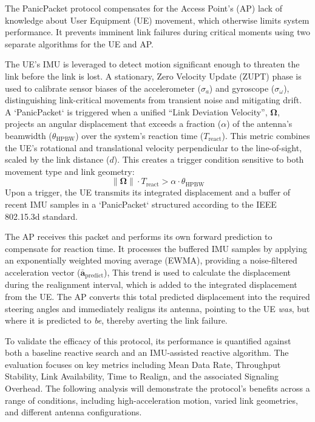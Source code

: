 \documentclass[fleqn,10pt]{wlscirep}
\begin{document}
The PanicPacket protocol compensates for the Access Point's (AP) lack of knowledge about User Equipment (UE) movement, which otherwise limits system performance. It prevents imminent link failures during critical moments using two separate algorithms for the UE and AP.

The UE's IMU is leveraged to detect motion significant enough to threaten the link before the link is lost. A stationary, Zero Velocity Update (ZUPT) phase is used to calibrate sensor biases of the accelerometer ($\sigma_a$) and gyroscope ($\sigma_{\omega}$), distinguishing link-critical movements from transient noise and mitigating drift. A `PanicPacket` is triggered when a unified ``Link Deviation Velocity'', $\boldsymbol{\Omega}$, projects an angular displacement that exceeds a fraction ($\alpha$) of the antenna's beamwidth ($\theta_{\text{HPBW}}$) over the system's reaction time ($T_{\text{react}}$). This metric combines the UE's rotational and translational velocity perpendicular to the line-of-sight, scaled by the link distance ($d$). This creates a trigger condition sensitive to both movement type and link geometry:
\begin{equation}
    \|\boldsymbol{\Omega}\| \cdot T_{\text{react}} > \alpha \cdot \theta_{\text{HPBW}}
\end{equation}
Upon a trigger, the UE transmits its integrated displacement and a buffer of recent IMU samples in a `PanicPacket` structured according to the IEEE 802.15.3d standard.

The AP receives this packet and performs its own forward prediction to compensate for reaction time. It processes the buffered IMU samples by applying an exponentially weighted moving average (EWMA), providing a noise-filtered acceleration vector ($\bar{\mathbf{a}}_{\text{predict}}$), This trend is used to calculate the displacement during the realignment interval, which is added to the integrated displacement from the UE. The AP converts this total predicted displacement into the required steering angles and immediately realigns its antenna, pointing to the UE \textit{was}, but where it is predicted to \textit{be}, thereby averting the link failure.

To validate the efficacy of this protocol, its performance is quantified against both a baseline reactive search and an IMU-assisted reactive algorithm. The evaluation focuses on key metrics including Mean Data Rate, Throughput Stability, Link Availability, Time to Realign, and the associated Signaling Overhead. The following analysis will demonstrate the protocol's benefits across a range of conditions, including high-acceleration motion, varied link geometries, and different antenna configurations.
\end{document}
